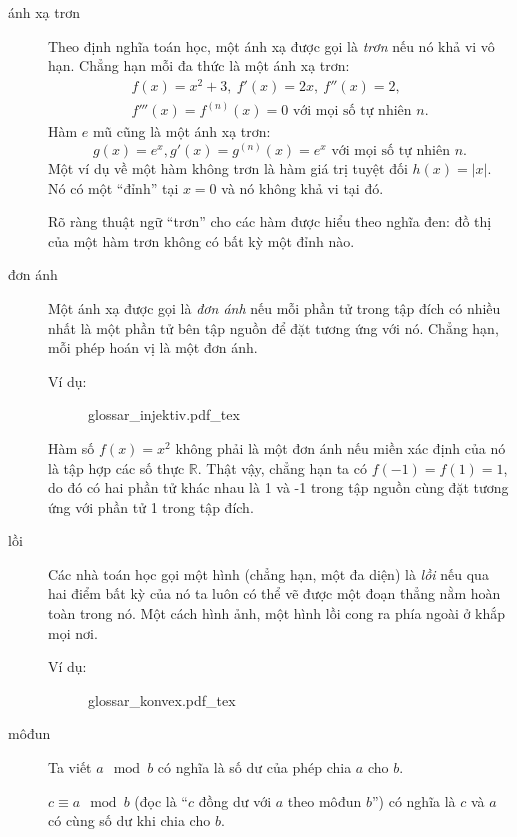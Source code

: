 \begin{description}
	\item[ánh xạ trơn] Theo định nghĩa toán học, một ánh xạ được gọi là \emph{trơn} nếu nó khả vi vô hạn. Chẳng hạn mỗi đa thức là một ánh xạ trơn:
			\begin{gather*}
				f(x) = x^2 + 3,\ f'(x) = 2x,\ f''(x) = 2,\\
				f'''(x) = f^{(n)}(x) = 0 \text{ với mọi số tự nhiên } n.
			\end{gather*}
			Hàm $e$ mũ cũng là một ánh xạ trơn:
			\begin{equation*}
				g(x) = e^x, g'(x) = g^{(n)}(x) = e^x \text{ với mọi số tự nhiên } n.
			\end{equation*}
			Một ví dụ về một hàm không trơn là hàm giá trị tuyệt đối $h(x) = |x|.$ Nó có một \enquote{đỉnh} tại $x=0$ và nó không khả vi tại đó.

			Rõ ràng thuật ngữ \enquote{trơn} cho các hàm được hiểu theo nghĩa đen: đồ thị của một hàm trơn không có bất kỳ một đỉnh nào.

	\item[đơn ánh] Một ánh xạ được gọi là \emph{đơn ánh} nếu mỗi phần tử trong tập đích có nhiều nhất là một phần tử bên tập nguồn để đặt tương ứng với nó. Chẳng hạn, mỗi phép hoán vị là một đơn ánh.

		Ví dụ:
		\begin{figure}
			\def\svgwidth{200pt}
			{glossar_injektiv.pdf_tex}
		\end{figure}
		Hàm số $f(x) = x^2$ không phải là một đơn ánh nếu miền xác định của nó là tập hợp các số thực $\mathbb R$. Thật vậy, chẳng hạn ta có $f(-1) = f(1) = 1$, do đó có hai phần tử khác nhau là 1 và -1 trong tập nguồn cùng đặt tương ứng với phần tử 1 trong tập đích.

	\item[lồi] Các nhà toán học gọi một hình (chẳng hạn, một đa diện) là \emph{lồi} nếu qua hai điểm bất kỳ của nó ta luôn có thể vẽ được một đoạn thẳng nằm hoàn toàn trong nó. Một cách hình ảnh, một hình lồi cong ra phía ngoài ở khắp mọi nơi.

		Ví dụ:
		\begin{figure}
			\def\svgwidth{270pt}
			{glossar_konvex.pdf_tex}
		\end{figure}

	\item[môđun] Ta viết $a \mod b$ có nghĩa là số dư của phép chia $a$ cho $b$.

		$c\equiv a \mod b$ (đọc là \enquote{$c$ đồng dư với $a$ theo môđun $b$}) có nghĩa là $c$ và $a$ có cùng số dư khi chia cho $b$.


\end{description}
